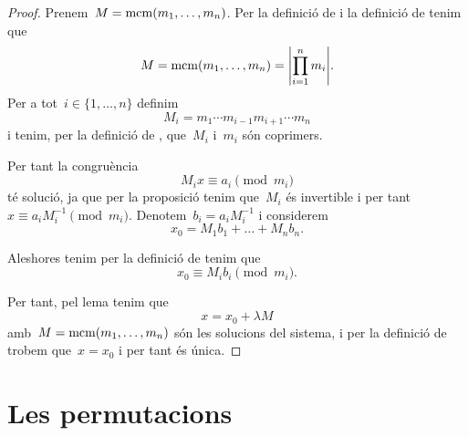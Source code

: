 \documentclass[../../main.tex]{subfiles}
\begin{document}
    \begin{proof}
        Prenem~\(M=\operatorname{mcm}(m_{1},\dots,m_{n})\).
        Per la definició de  i la definició de  tenim que \[M=\mcm(m_{1},\dots,m_{n})=\abs{\prod_{i=1}^{n}m_{i}}.\]
        Per a tot~\(i\in\{1,\dots,n\}\) definim
        \[
            M_{i}=m_{1}\cdots m_{i-1}m_{i+1}\cdots m_{n}
        \]
        i tenim, per la definició de , que~\(M_{i}\) i~\(m_{i}\) són coprimers.

        Per tant la congruència
        \[
            M_{i}x\equiv a_{i}\pmod{m_{i}}
        \]
        té solució, ja que per la proposició  tenim que~\(M_{i}\) és invertible i per tant~\(x\equiv a_{i}M_{i}^{-1}\pmod{m_{i}}\).
        Denotem~\(b_{i}=a_{i}M_{i}^{-1}\) i considerem
        \[
            x_{0}=M_{1}b_{1}+\dots+M_{n}b_{n}.
        \]

        Aleshores tenim per la definició de  tenim que
        \[
            x_{0}\equiv M_{i}b_{i}\pmod{m_{i}}.
        \]

        Per tant, pel lema  tenim que
        \[
            x=x_{0}+\lambda M
        \]
        amb~\(M=\operatorname{mcm}(m_{1},\dots,m_{n})\) són les solucions del sistema, i per la definició de  trobem que~\(x=x_{0}\) i per tant és única.
    \end{proof}
\section{Les permutacions}
\end{document}
